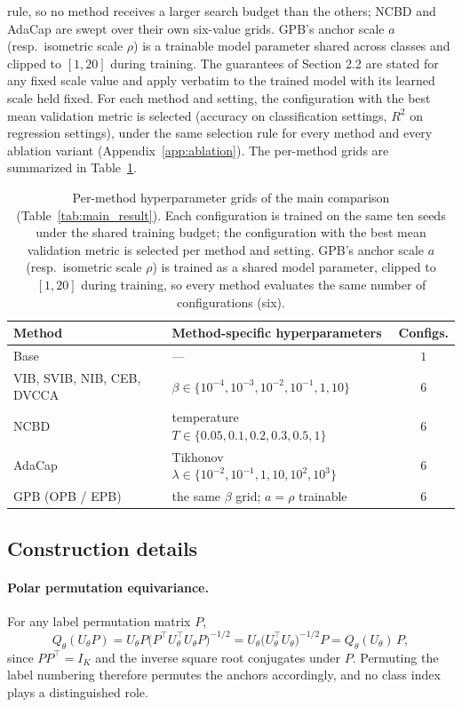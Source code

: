 rule, so no method receives a larger search budget than the others;
NCBD and AdaCap are swept over their own six-value grids. GPB's anchor
scale $a$ (resp.\ isometric scale $\rho$) is a trainable model parameter
shared across classes and clipped to
$[1,20]$ during training. The guarantees of Section 2.2 are stated for
any fixed scale value and apply verbatim to the trained model with its
learned scale held fixed. For each method and setting, the
configuration with the best mean validation metric is selected (accuracy
on classification settings, $R^2$ on regression settings), under the
same selection rule for every method and every ablation variant
(Appendix~\ref{app:ablation}). The per-method grids are summarized in
Table~\ref{tab:search-protocol}.

\begin{table}[t]
\centering\small
\setlength{\tabcolsep}{3pt}
\caption{Per-method hyperparameter grids of the main comparison
(Table~\ref{tab:main_result}). Each configuration is trained on the same
ten seeds under the shared training budget; the configuration with the
best mean validation metric is selected per method and setting. GPB's
anchor scale $a$ (resp.\ isometric scale $\rho$) is trained as a shared
model parameter, clipped to $[1,20]$ during training, so every method
evaluates the same number of configurations (six).}
\label{tab:search-protocol}
\begin{tabular}{l l c}
\hline
Method & Method-specific hyperparameters & Configs. \\
\hline
Base & --- & $1$ \\
VIB, SVIB, NIB, CEB, DVCCA & $\beta\in\{10^{-4},10^{-3},10^{-2},10^{-1},1,10\}$ & $6$ \\
NCBD & temperature $T\in\{0.05,0.1,0.2,0.3,0.5,1\}$ & $6$ \\
AdaCap & Tikhonov $\lambda\in\{10^{-2},10^{-1},1,10,10^{2},10^{3}\}$ & $6$ \\
GPB (OPB / EPB) & the same $\beta$ grid; $a=\rho$ trainable & $6$ \\
\hline
\end{tabular}
\end{table}
\subsection{Construction details}
\label{app:construction}

\paragraph{Polar permutation equivariance.} For any label permutation matrix $P$,
\begin{equation}
Q_\theta(U_\theta P)
= U_\theta P \bigl( P^{\top} U_\theta^{\top} U_\theta P \bigr)^{-1/2}
= U_\theta \bigl( U_\theta^{\top} U_\theta \bigr)^{-1/2} P
= Q_\theta(U_\theta)\, P ,
\label{eq:opb-equivariance}
\end{equation}
since $P P^{\top} = I_K$ and the inverse square root conjugates under $P$. Permuting
the label numbering therefore permutes the anchors accordingly, and no class index
plays a distinguished role.

